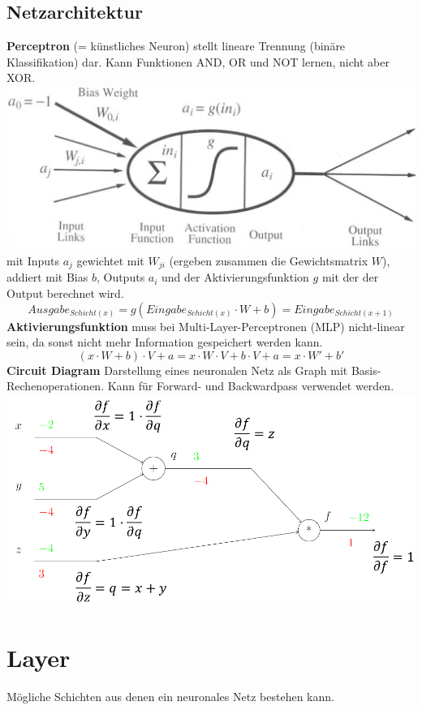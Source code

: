 \documentclass[12pt]{article}
\begin{document}
	\subsection{Netzarchitektur}
	\textbf{Perceptron} (= künstliches Neuron) stellt lineare Trennung (binäre Klassifikation) dar. Kann Funktionen AND, OR und NOT lernen, nicht aber XOR.\\
	\includegraphics[width=\linewidth]{figures/perceptron.png}\\
	mit Inputs $a_j$ gewichtet mit $W_{ji}$ (ergeben zusammen die Gewichtsmatrix $W$), addiert mit Bias $b$, Outputs $a_i$ und der Aktivierungsfunktion $g$ mit der der Output berechnet wird.
	$$Ausgabe_{Schicht(x)} = g(Eingabe_{Schicht(x)} \cdot W + b) = Eingabe_{Schicht(x+1)}$$
	\textbf{Aktivierungsfunktion} muss bei Multi-Layer-Perceptronen (MLP) nicht-linear sein, da sonst nicht mehr Information gespeichert werden kann.
	$$(x \cdot W + b) \cdot V + a = x \cdot W \cdot V + b \cdot V + a = x \cdot W' + b'$$
	\textbf{Circuit Diagram} Darstellung eines neuronalen Netz als Graph mit Basis-Rechenoperationen. Kann für Forward- und Backwardpass verwendet werden.\\
	\includegraphics[width=\linewidth]{figures/circuit-diagram.png}\\

	\section{Layer}
	Mögliche Schichten aus denen ein neuronales Netz bestehen kann.
\end{document}

